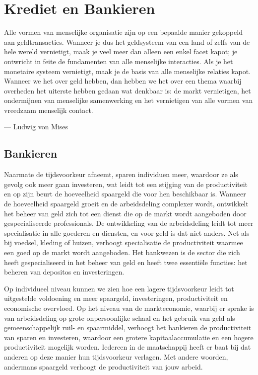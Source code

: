 \hypertarget{krediet-en-bankieren}{%
\chapter{Krediet en Bankieren}\label{krediet-en-bankieren}}

\begin{blockquotebox}
    Alle vormen van menselijke organisatie zijn op een bepaalde manier gekoppeld aan geldtransacties. Wanneer je dus het geldsysteem van een land of zelfs van de hele wereld vernietigt, maak je veel meer dan alleen een enkel facet kapot; je ontwricht in feite de fundamenten van alle menselijke interacties. Als je het monetaire systeem vernietigt, maak je de basis van alle menselijke relaties kapot. Wanneer we het over geld hebben, dan hebben we het over een thema waarbij overheden het uiterste hebben gedaan wat denkbaar is: de markt vernietigen, het ondermijnen van menselijke samenwerking en het vernietigen van alle vormen van vreedzaam menselijk contact.
    \par\raggedleft--- Ludwig von Mises
\end{blockquotebox}

\hypertarget{bankieren}{%
\section{Bankieren}\label{bankieren}}

Naarmate de tijdsvoorkeur afneemt, sparen individuen meer, waardoor ze als gevolg ook meer gaan investeren, wat leidt tot een stijging van de productiviteit en op zijn beurt de hoeveelheid spaargeld die voor hen beschikbaar is. Wanneer de hoeveelheid spaargeld groeit en de arbeidsdeling complexer wordt, ontwikkelt het beheer van geld zich tot een dienst die op de markt wordt aangeboden door gespecialiseerde professionals. De ontwikkeling van de arbeidsdeling leidt tot meer specialisatie in alle goederen en diensten, en voor geld is dat niet anders. Net als bij voedsel, kleding of huizen, verhoogt specialisatie de productiviteit waarmee een goed op de markt wordt aangeboden. Het bankwezen is de sector die zich heeft gespecialiseerd in het beheer van geld en heeft twee essentiële functies: het beheren van deposito\textquotesingle s en investeringen.

Op individueel niveau kunnen we zien hoe een lagere tijdsvoorkeur leidt tot uitgestelde voldoening en meer spaargeld, investeringen, productiviteit en economische overvloed. Op het niveau van de markteconomie, waarbij er sprake is van arbeidsdeling op grote onpersoonlijke schaal en het gebruik van geld als gemeenschappelijk ruil- en spaarmiddel, verhoogt het bankieren de productiviteit van sparen en investeren, waardoor een grotere kapitaalaccumulatie en een hogere productiviteit mogelijk worden. Iedereen in de maatschappij heeft er baat bij dat anderen op deze manier hun tijdsvoorkeur verlagen. Met andere woorden, andermans spaargeld verhoogt de productiviteit van jouw arbeid.

